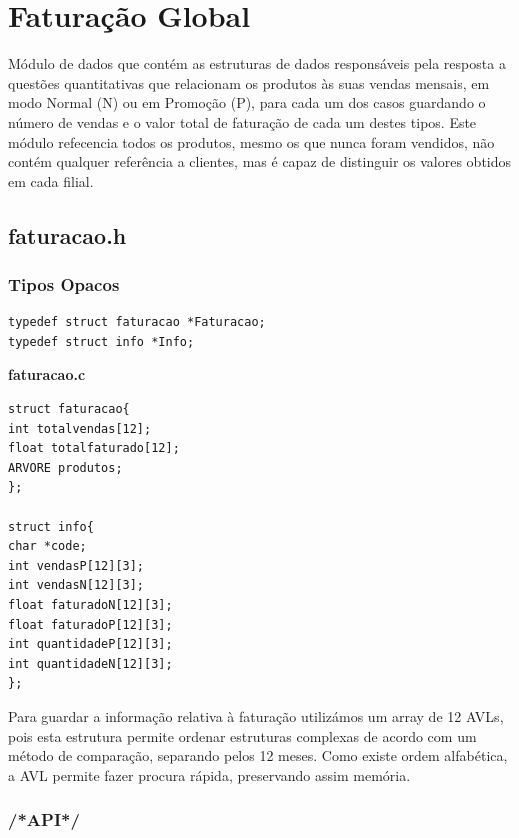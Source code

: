 \section{Faturação Global}

Módulo de dados que contém as estruturas de dados responsáveis pela resposta a questões quantitativas que relacionam os produtos às suas vendas mensais, em modo Normal (N) ou em Promoção (P), para cada um dos casos guardando o número de vendas e o valor total de faturação de cada um destes tipos. Este módulo refecencia todos os produtos, mesmo os que nunca foram vendidos, não contém qualquer referência a clientes, mas é capaz de distinguir os valores obtidos em cada filial. 

\subsection{faturacao.h}

\subsubsection{Tipos Opacos}
\begin{Verbatim}
typedef struct faturacao *Faturacao;
typedef struct info *Info;
\end{Verbatim}

\textbf{faturacao.c}
\begin{verbatim}
struct faturacao{
int totalvendas[12];
float totalfaturado[12];
ARVORE produtos;
};

struct info{
char *code;
int vendasP[12][3];
int vendasN[12][3];
float faturadoN[12][3];
float faturadoP[12][3];
int quantidadeP[12][3];
int quantidadeN[12][3];
};
\end{verbatim}

Para guardar a informação relativa à faturação utilizámos um array de 12 AVLs, pois esta estrutura permite ordenar estruturas complexas de acordo com um método de comparação, separando pelos 12 meses. Como existe ordem alfabética, a AVL permite fazer procura rápida, preservando assim memória. 

\subsubsection{/*API*/}

